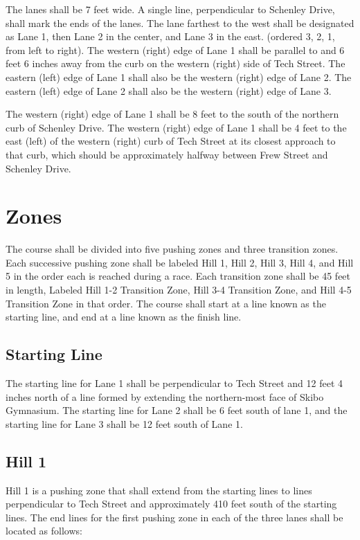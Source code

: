 	The lanes shall be 7 feet wide. A single line, perpendicular to Schenley Drive,
	shall mark the ends of the lanes. The lane farthest to the west shall be
	designated as Lane 1, then Lane 2 in the center, and Lane 3 in the east.
	(ordered 3, 2, 1, from left to right). The western (right)
	edge of Lane 1 shall be parallel to and 6 feet 6 inches away from the curb on
	the western (right) side of Tech Street. The eastern (left) edge of Lane 1
	shall also be the western (right) edge of Lane 2. The eastern (left) edge of
	Lane 2 shall also be the western (right) edge of Lane 3.

	The western (right) edge of Lane 1 shall be 8 feet to the south of the northern
	curb of Schenley Drive. The western (right) edge of Lane 1 shall be 4 feet to
	the east (left) of the western (right) curb of Tech Street at its closest
	approach to that curb, which should be approximately halfway between Frew
	Street and Schenley Drive.

\section{Zones}

	The course shall be divided into five pushing zones and three transition zones. 
	Each successive pushing zone shall be labeled Hill 1, Hill 2, Hill 3, Hill 4, and 
	Hill 5 in the order each is reached during a race. Each transition zone shall be 
	45 feet in length, Labeled Hill 1-2 Transition Zone, Hill 3-4 Transition Zone, and 
	Hill 4-5 Transition Zone in that order. The course shall start at a line known as 
	the starting line, and end at a line known as the finish line.

\subsection{Starting Line}

	The starting line for Lane 1 shall be perpendicular to Tech Street and 12 feet
	4 inches north of a line formed by extending the northern-most face of Skibo
	Gymnasium. The starting line for Lane 2 shall be 6 feet south of lane 1, and
	the starting line for Lane 3 shall be 12 feet south of Lane 1.

\subsection{Hill 1}

	Hill 1 is a pushing zone that shall extend from the starting lines to lines 
	perpendicular to Tech Street and approximately 410 feet south of the starting lines. 
	The end lines for the first pushing zone in each of the three lanes shall be located 
	as follows:

